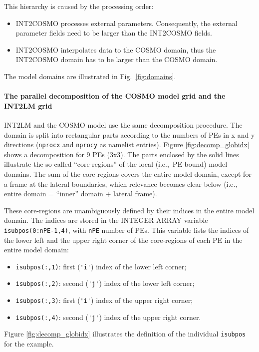 \documentclass[11pt,twoside]{article}
\begin{document}
This hierarchy is caused by the processing order:
\begin{itemize}
\item INT2COSMO processes external parameters. Consequently, the external
parameter fields need to be larger than the INT2COSMO fields.
\item INT2COSMO interpolates data to the COSMO domain, thus the INT2COSMO domain
has to be larger than the COSMO domain.
\end{itemize}
The model domains are illustrated in Fig.\ \ref{fig:domains}.

\paragraph{The parallel decomposition of the COSMO model grid and the 
INT2LM grid\\}
INT2LM and the COSMO model use the same decomposition procedure.
The domain is split into rectangular parts according to the numbers of PEs in
x and y directions (\verb|nprocx| and \verb|nprocy| as namelist entries). 
Figure \ref{fig:decomp_globidx} shows a decomposition for 9 PEs (3x3). 
The parts enclosed by the solid lines illustrate the so-called  ``core-regions''
of the local  (i.e.,\ PE-bound) model domains. The sum of the core-regions covers 
the entire model domain, except for a frame at the lateral boundaries, which 
relevance becomes clear below (i.e., entire domain = ``inner'' domain + lateral
frame).

These core-regions are unambiguously defined by their indices in the 
entire model domain. The indices are stored
in the {\footnotesize INTEGER ARRAY} variable \verb|isubpos(0:nPE-1,4)|, 
with \verb|nPE| number of PEs. 
This variable lists the indices of the lower left and the 
upper right corner of the core-regions of each PE in the entire model domain:
\begin{itemize}
\item \verb|isubpos(:,1)|: first (\verb|'i'|) index  of the lower left corner; 
\item \verb|isubpos(:,2)|: second (\verb|'j'|) index of the lower left corner; 
\item \verb|isubpos(:,3)|: first (\verb|'i'|) index of the upper right corner; 
\item \verb|isubpos(:,4)|: second (\verb|'j'|) index of the upper right corner.
\end{itemize}
Figure \ref{fig:decomp_globidx} illustrates the definition of the individual
\verb|isubpos| for the example. 
\end{document}
